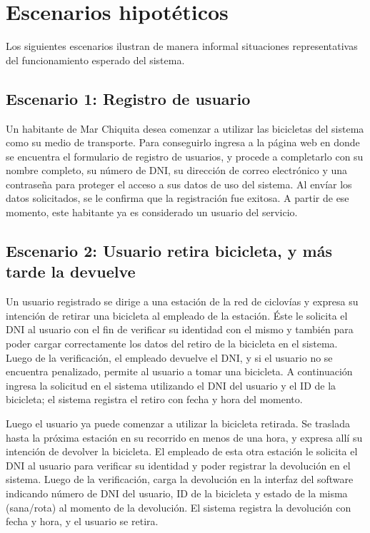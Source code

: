 \documentclass[a4paper, 10pt, twoside]{article}
\begin{document}
\section{Escenarios hipotéticos}


Los siguientes escenarios ilustran de manera informal situaciones representativas del funcionamiento esperado del sistema.


\subsection{Escenario 1: Registro de usuario}

Un habitante de Mar Chiquita desea comenzar a utilizar las bicicletas del sistema como su medio de transporte. Para conseguirlo ingresa a la página web en donde se encuentra el formulario de registro de usuarios, y procede a completarlo con su nombre completo, su número de DNI, su dirección de correo electrónico y una contraseña para proteger el acceso a sus datos de uso del sistema. Al envíar los datos solicitados, se le confirma que la registración fue exitosa. A partir de ese momento, este habitante ya es considerado un usuario del servicio.


\subsection{Escenario 2: Usuario retira bicicleta, y más tarde la devuelve}

Un usuario registrado se dirige a una estación de la red de ciclovías y expresa su intención de retirar una bicicleta al empleado de la estación. Éste le solicita el DNI al usuario con el fin de verificar su identidad con el mismo y también para poder cargar correctamente los datos del retiro de la bicicleta en el sistema. Luego de la verificación, el empleado devuelve el DNI, y si el usuario no se encuentra penalizado, permite al usuario a tomar una bicicleta. A continuación ingresa la solicitud en el sistema utilizando el DNI del usuario y el ID de la bicicleta; el sistema registra el retiro con fecha y hora del momento.

Luego el usuario ya puede comenzar a utilizar la bicicleta retirada. Se traslada hasta la próxima estación en su recorrido en menos de una hora, y expresa allí su intención de devolver la bicicleta. El empleado de esta otra estación le solicita el DNI al usuario para verificar su identidad y poder registrar la devolución en el sistema. Luego de la verificación, carga la devolución en la interfaz del software indicando número de DNI del usuario, ID de la bicicleta y estado de la misma (sana/rota) al momento de la devolución. El sistema registra la devolución con fecha y hora, y el usuario se retira.
\end{document}
